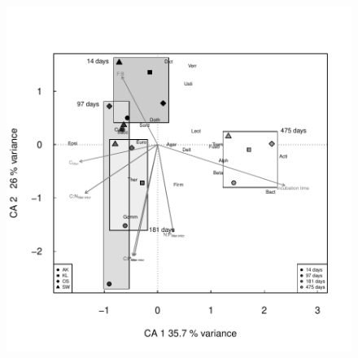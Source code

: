 \documentclass[10pt]{article}
\begin{document}
\begin{flushleft}


\newpage
\begin{figure}[h!]
\vspace*{2mm}
\begin{center}
\includegraphics{ligpaper-metaprot_pca}
\end{center}
\end{figure}


\end{flushleft}
\end{document}
